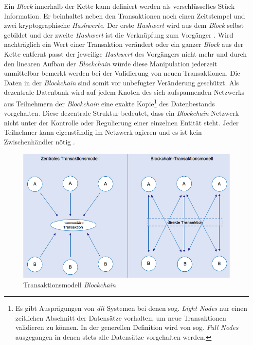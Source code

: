 Ein \textit{Block} innerhalb der Kette kann definiert werden als verschlüsseltes Stück Information. Er beinhaltet neben den Transaktionen noch einen Zeitstempel und zwei kryptographische \textit{Hashwerte}. Der erste \textit{Hashwert} wird aus dem \textit{Block} selbst gebildet und der zweite \textit{Hashwert} ist die Verknüpfung zum Vorgänger \citep{Tschorsch2016}. Wird nachträglich ein Wert einer Transaktion verändert oder ein ganzer \textit{Block} aus der Kette entfernt passt der jeweilige \textit{Hashwert} des Vorgängers nicht mehr und durch den linearen Aufbau der \textit{Blockchain} würde diese Manipulation jederzeit unmittelbar bemerkt werden bei der Validierung von neuen Transaktionen. Die Daten in der \textit{Blockchain} sind somit vor unbefugter Veränderung geschützt. Als dezentrale Datenbank wird auf jedem Knoten des sich aufspannenden Netzwerks aus Teilnehmern der \textit{Blockchain} eine exakte Kopie\footnote{Es gibt Ausprägungen von \textit{\ac{dlt}} Systemen bei denen sog. \textit{Light Nodes} nur einen zeitlichen Abschnitt der Datensätze vorhalten, um neue Transaktionen validieren zu können. In der generellen Definition wird von sog. \textit{Full Nodes} ausgegangen in denen stets alle Datensätze vorgehalten werden.} des Datenbestands vorgehalten. Diese dezentrale Struktur bedeutet, dass ein \textit{Blockchain} Netzwerk nicht unter der Kontrolle oder Regulierung einer einzelnen Entität steht. Jeder Teilnehmer kann eigenständig im Netzwerk agieren und es ist kein Zwischenhändler nötig \citep{Drescher2017, Meier2018}.

\begin{figure}[H]
	\centering
	\includegraphics[width=1.0\linewidth]{pictures/change-in-transaction-model-blockchain}
	\caption[Transaktionsmodell \textit{Blockchain}]{Transaktionsmodell \textit{Blockchain} \citep{Wald2017}}
	\label{fig:change-in-transaction-model-blockchain}
\end{figure}

